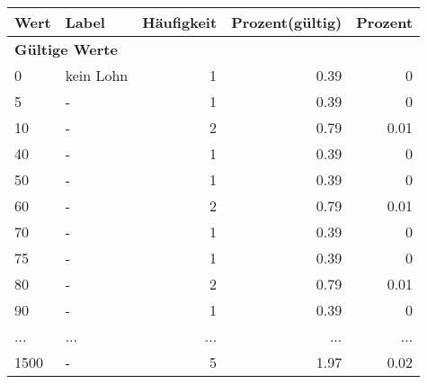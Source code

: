      \begin{longtable}{lXrrr}
     \toprule
     \textbf{Wert} & \textbf{Label} & \textbf{Häufigkeit} & \textbf{Prozent(gültig)} & \textbf{Prozent} \\
     \endhead
     \midrule
     \multicolumn{5}{l}{\textbf{Gültige Werte}}\\
        0 & \multicolumn{1}{X}{kein Lohn} & %
          \num{1} &
          \num[round-mode=places,round-precision=2]{0,39} &
          \num[round-mode=places,round-precision=2]{0} \\
        5 & \multicolumn{1}{X}{-} & %
          \num{1} &
          \num[round-mode=places,round-precision=2]{0,39} &
          \num[round-mode=places,round-precision=2]{0} \\
        10 & \multicolumn{1}{X}{-} & %
          \num{2} &
          \num[round-mode=places,round-precision=2]{0,79} &
          \num[round-mode=places,round-precision=2]{0,01} \\
        40 & \multicolumn{1}{X}{-} & %
          \num{1} &
          \num[round-mode=places,round-precision=2]{0,39} &
          \num[round-mode=places,round-precision=2]{0} \\
        50 & \multicolumn{1}{X}{-} & %
          \num{1} &
          \num[round-mode=places,round-precision=2]{0,39} &
          \num[round-mode=places,round-precision=2]{0} \\
        60 & \multicolumn{1}{X}{-} & %
          \num{2} &
          \num[round-mode=places,round-precision=2]{0,79} &
          \num[round-mode=places,round-precision=2]{0,01} \\
        70 & \multicolumn{1}{X}{-} & %
          \num{1} &
          \num[round-mode=places,round-precision=2]{0,39} &
          \num[round-mode=places,round-precision=2]{0} \\
        75 & \multicolumn{1}{X}{-} & %
          \num{1} &
          \num[round-mode=places,round-precision=2]{0,39} &
          \num[round-mode=places,round-precision=2]{0} \\
        80 & \multicolumn{1}{X}{-} & %
          \num{2} &
          \num[round-mode=places,round-precision=2]{0,79} &
          \num[round-mode=places,round-precision=2]{0,01} \\
        90 & \multicolumn{1}{X}{-} & %
          \num{1} &
          \num[round-mode=places,round-precision=2]{0,39} &
          \num[round-mode=places,round-precision=2]{0} \\
       ... & ... & ... & ... & ... \\
        1500 & \multicolumn{1}{X}{-} & %
          \num{5} &
          \num[round-mode=places,round-precision=2]{1,97} &
          \num[round-mode=places,round-precision=2]{0,02} \\


\end{longtable}
